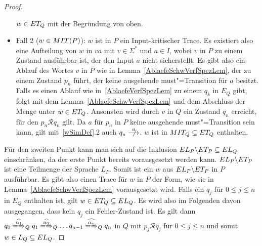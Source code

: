 \begin{proof}
\begin{itemize}
      $w\in ET _Q$ mit der Begründung von oben.
    \item Fall 2 ($w\in MIT (P)$): $w$ ist in $P$ ein Input-kritischer Trace.
      Es existiert also eine Aufteilung von $w$ in $va$ mit $v\in \Sigma ^*$
      und $a\in I$, wobei $v$ in $P$ zu einem Zustand ausführbar ist, der den
      Input $a$ nicht sicherstellt. Es gibt also ein Ablauf des Wortes $v$ in
      $P$ wie in Lemma~\ref{AblaefeSchwVerfSpezLem}, der zu einem Zustand $p_n$
      führt, der keine ausgehende must"=Transition für $a$ besitzt. Falls es
      einen Ablauf wie in~\ref{AblaefeVerfSpezLem} zu einem $q_k$ in $E_Q$
      gibt, folgt mit dem Lemma~\ref{AblaefeSchwVerfSpezLem} und dem Abschluss
      der Menge \ET{} unter \cont{} $w\in ET _Q$. Ansonsten wird durch $v$ in
      $Q$ ein Zustand $q_n$ erreicht, für den $p_n\mathcal{R} q_n$ gilt. Da $a$
      für $p_n$ in $P$ keine ausgehende must"=Transition sein kann, gilt
      mit~\ref{wSimDef}.2 auch $q_n \nmust[a]$. $w$ ist in $MIT _Q \subseteq
      ET _Q$ enthalten.
  \end{itemize}
  Für den zweiten Punkt kann man sich auf die Inklusion $EL _P\backslash ET _P
  \subseteq EL _Q$ einschränken, da der erste Punkt bereits vorausgesetzt
  werden kann. $EL _P\backslash ET _P$ ist eine Teilmenge der Sprache $L _P$.
  Somit ist ein $w$ aus $EL _P\backslash ET _P$ in $P$ ausführbar. Es gibt
  also einen Trace für $w$ in $P$ der Form, wie sie in
  Lemma~\ref{AblaefeSchwVerfSpezLem} vorausgesetzt wird. Falls ein $q_j$ für $0
  \leq j \leq n$ in $E_Q$ enthalten ist, gilt $w\in ET _Q \subseteq EL _Q$. Es
  wird also im Folgenden davon ausgegangen, dass kein $q_j$ ein Fehler-Zustand
  ist. Es gilt dann $q_0 \weakmay[\widehat{\alpha _1}]_Q q_1
  \weakmay[\widehat{\alpha _2}]_Q \dots q_{n-1} \weakmay[\widehat{\alpha _n}]_Q
  q_n$ in $Q$ mit $p_j \mathcal{R} q_j$ für $0 \leq j \leq n$ und somit $w\in L
  _Q\subseteq EL _Q$.


\end{proof}
